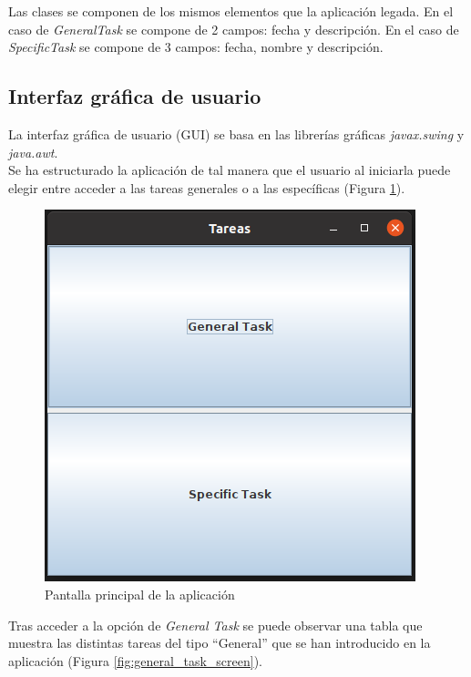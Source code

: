 \documentclass[10pt,a4paper]{article}
\begin{document}
Las clases se componen de los mismos elementos que la aplicación legada. En el caso de \emph{GeneralTask} se compone de 2 campos: fecha y descripción. En el caso de \emph{SpecificTask} se compone de 3 campos: fecha, nombre y descripción.

\subsection{Interfaz gráfica de usuario}

La interfaz gráfica de usuario (GUI) se basa en las librerías gráficas \emph{javax.swing} y \emph{java.awt}.\\
Se ha estructurado la aplicación de tal manera que el usuario al iniciarla puede elegir entre acceder a las tareas generales o a las específicas (Figura \ref{fig:main_screen}).

\begin{figure}[h!]
\centering
\includegraphics[scale=0.4]{images/main_screen.png}
\caption{Pantalla principal de la aplicación}
\label{fig:main_screen}
\end{figure}

Tras acceder a la opción de \emph{General Task} se puede observar una tabla que muestra las distintas tareas del tipo ``General'' que se han introducido en la aplicación (Figura \ref{fig:general_task_screen}).
\end{document}
